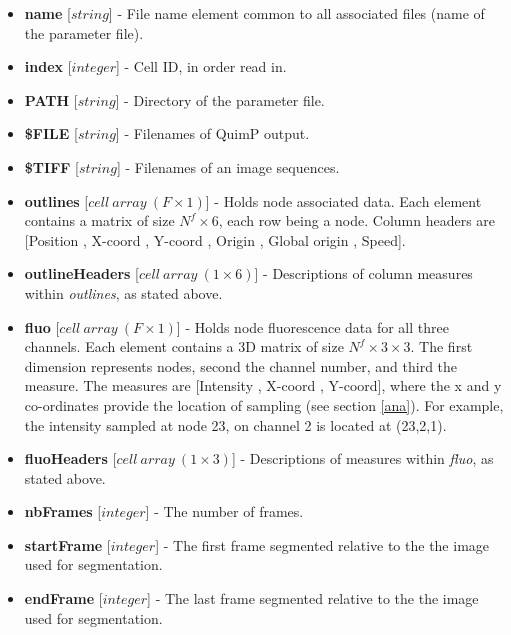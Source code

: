 \documentclass[a4paper,12pt]{article}
\begin{document}
\begin{itemize}

 \item \textbf{name} [$string$] - File name element common to all associated files (name of the parameter file).
 
  \item \textbf{index} [$integer$] - Cell ID, in order read in.
 
 \item \textbf{PATH} [$string$] - Directory of the parameter file.
 
 \item \textbf{\$FILE} [$string$] - Filenames of  QuimP output.
 
 \item \textbf{\$TIFF} [$string$] - Filenames of an image sequences.
 
  \item \textbf{outlines} [$cell~array~(F\times1)$]  - Holds node associated data. Each element
 contains a matrix of size $N^{f}\times6$,
each row being a node. Column headers are [Position , X-coord , Y-coord , Origin , Global origin ,  Speed].
 
 \item \textbf{outlineHeaders} [$cell~array~(1\times6)$] - Descriptions of column measures within \textit{outlines},
  as stated above.
  
 \item \textbf{fluo} [$cell~array~(F\times1)$] - Holds node fluorescence data for all three channels. Each element contains a 
  3D matrix of size $N^{f}\times3\times3$.  The first dimension represents nodes, second the channel number, and third the
  measure.   The measures are [Intensity , X-coord , Y-coord], where the x and y co-ordinates provide the location of
  sampling (see section \ref{ana}).  For example, the intensity sampled at node 23, on channel 2 is located at (23,2,1).
  
 \item \textbf{fluoHeaders} [$cell~array~(1\times3)$] - Descriptions of measures within \textit{fluo}, as 
 stated above.
 
 \item \textbf{nbFrames} [$integer$] - The number of frames.

 \item \textbf{startFrame} [$integer$] - The first frame segmented relative to the the image used for segmentation.

 \item \textbf{endFrame} [$integer$] - The last frame segmented relative to the the image used for segmentation.


\end{itemize}
\end{document}
